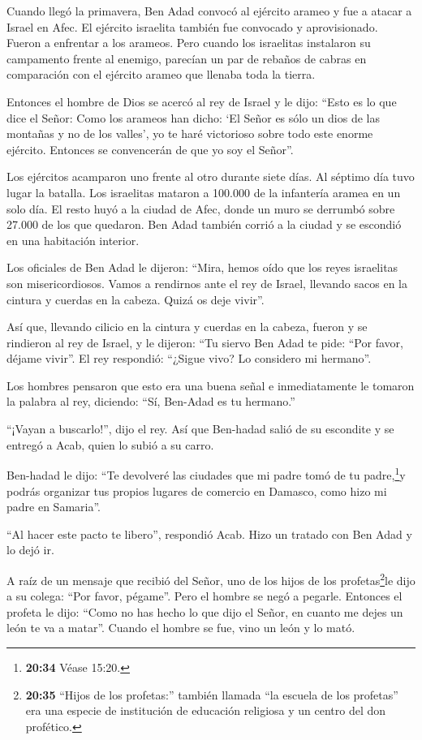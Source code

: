  Cuando llegó la primavera, Ben Adad convocó al ejército
arameo y fue a atacar a Israel en Afec.  El ejército
israelita también fue convocado y aprovisionado. Fueron a enfrentar a
los arameos. Pero cuando los israelitas instalaron su campamento frente
al enemigo, parecían un par de rebaños de cabras en comparación con el
ejército arameo que llenaba toda la tierra.

 Entonces el hombre de Dios se acercó al rey de Israel y le
dijo: ``Esto es lo que dice el Señor: Como los arameos han dicho: `El
Señor es sólo un dios de las montañas y no de los valles', yo te haré
victorioso sobre todo este enorme ejército. Entonces se convencerán de
que yo soy el Señor''.

 Los ejércitos acamparon uno frente al otro durante siete
días. Al séptimo día tuvo lugar la batalla. Los israelitas mataron a
100.000 de la infantería aramea en un solo día.  El resto
huyó a la ciudad de Afec, donde un muro se derrumbó sobre 27.000 de los
que quedaron. Ben Adad también corrió a la ciudad y se escondió en una
habitación interior.

 Los oficiales de Ben Adad le dijeron: ``Mira, hemos oído
que los reyes israelitas son misericordiosos. Vamos a rendirnos ante el
rey de Israel, llevando sacos en la cintura y cuerdas en la cabeza.
Quizá os deje vivir''.

 Así que, llevando cilicio en la cintura y cuerdas en la
cabeza, fueron y se rindieron al rey de Israel, y le dijeron: ``Tu
siervo Ben Adad te pide: ``Por favor, déjame vivir''. El rey respondió:
``¿Sigue vivo? Lo considero mi hermano''.

 Los hombres pensaron que esto era una buena señal e
inmediatamente le tomaron la palabra al rey, diciendo: ``Sí, Ben-Adad es
tu hermano.''

``¡Vayan a buscarlo!'', dijo el rey. Así que Ben-hadad salió de su
escondite y se entregó a Acab, quien lo subió a su carro.

 Ben-hadad le dijo: ``Te devolveré las ciudades que mi
padre tomó de tu padre,\footnote{\textbf{20:34} Véase 15:20.}y podrás
organizar tus propios lugares de comercio en Damasco, como hizo mi padre
en Samaria''.

``Al hacer este pacto te libero'', respondió Acab. Hizo un tratado con
Ben Adad y lo dejó ir.

 A raíz de un mensaje que recibió del Señor, uno de los
hijos de los profetas\footnote{\textbf{20:35} ``Hijos de los profetas:''
  también llamada ``la escuela de los profetas'' era una especie de
  institución de educación religiosa y un centro del don profético.}le
dijo a su colega: ``Por favor, pégame''. Pero el hombre se negó a
pegarle.  Entonces el profeta le dijo: ``Como no has hecho
lo que dijo el Señor, en cuanto me dejes un león te va a matar''. Cuando
el hombre se fue, vino un león y lo mató.

